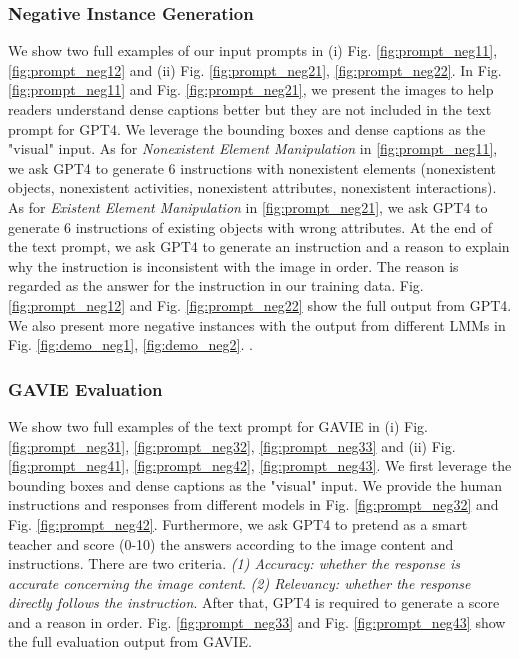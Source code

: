 \subsubsection{Negative Instance Generation}
We show two full examples of our input prompts in (i) Fig. \ref{fig:prompt_neg11}, \ref{fig:prompt_neg12} and (ii) Fig. \ref{fig:prompt_neg21}, \ref{fig:prompt_neg22}. In Fig. \ref{fig:prompt_neg11} and Fig. \ref{fig:prompt_neg21}, we present the images to help readers understand dense captions better but they are not included in the text prompt for GPT4. We leverage the bounding boxes and dense captions as the "visual" input. As for  \textit{Nonexistent Element Manipulation} in \ref{fig:prompt_neg11}, we ask GPT4 to generate 6 instructions with nonexistent elements (nonexistent objects, nonexistent activities, nonexistent attributes, nonexistent interactions). As for  \textit{Existent Element Manipulation} in \ref{fig:prompt_neg21}, we ask GPT4 to generate 6 instructions of existing objects with wrong attributes. At the end of the text prompt, we ask GPT4 to generate an instruction and a reason to explain why the instruction is inconsistent with the image in order. The reason is regarded as the answer for the instruction in our training data. Fig. \ref{fig:prompt_neg12} and Fig. \ref{fig:prompt_neg22} show the full output from GPT4. We also present more negative instances with the output from different LMMs in Fig. \ref{fig:demo_neg1}, \ref{fig:demo_neg2}.
.
\subsubsection{GAVIE Evaluation}
We show two full examples of the text prompt for GAVIE in (i) Fig. \ref{fig:prompt_neg31}, \ref{fig:prompt_neg32}, \ref{fig:prompt_neg33} and (ii) Fig. \ref{fig:prompt_neg41}, \ref{fig:prompt_neg42}, \ref{fig:prompt_neg43}. We first leverage the bounding boxes and dense captions as the "visual" input. We provide the human instructions and responses from different models in Fig. \ref{fig:prompt_neg32} and Fig. \ref{fig:prompt_neg42}. Furthermore, we ask GPT4 to pretend as a smart teacher and score (0-10) the answers according to the image content and instructions. There are two criteria. \textit{(1) Accuracy: whether the response is accurate concerning the image content}. \textit{(2) Relevancy: whether the response directly follows the instruction}. After that, GPT4 is required to generate a score and a reason in order. Fig. \ref{fig:prompt_neg33}  and Fig. \ref{fig:prompt_neg43} show the full evaluation output from GAVIE.


